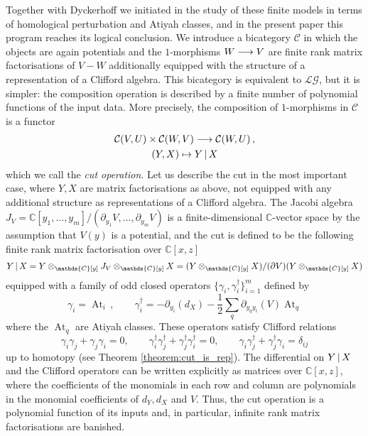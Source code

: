 \documentclass[english,letter paper,12pt,leqno]{article}
\theoremstyle{example}
\numberwithin{equation}{section}
\def\LG{\mathcal{LG}}
\def\be{\begin{equation}}
\def\ee{\end{equation}}
\def\nC{\mathds{C}}
\def\L{\mathcal{C}}
\def\ferm{\gamma}
\def\fermc{\gamma^\dagger}
\DeclareMathOperator{\At}{At}
\begin{document}
Together with Dyckerhoff we initiated in \cite{dm1102.2957} the study of these finite models in terms of homological perturbation and Atiyah classes, and in the present paper this program reaches its logical conclusion. We introduce a bicategory $\L$ in which the objects are again potentials and the $1$-morphisms $W \longrightarrow V$ are finite rank matrix factorisations of $V - W$ additionally equipped with the structure of a representation of a Clifford algebra. This bicategory is equivalent to $\LG$, but it is simpler: the composition operation is described by a finite number of polynomial functions of the input data. More precisely, the composition of $1$-morphisms in $\L$ is a functor
\begin{gather}
\L(V,U) \times \L(W,V) \lto \L(W,U)\,,\label{eq:cut_functor_intro}\\
(Y,X) \mapsto Y \l X
\end{gather}
which we call the \emph{cut operation}. Let us describe the cut in the most important case, where $Y, X$ are matrix factorisations as above, not equipped with any additional structure as representations of a Clifford algebra. The Jacobi algebra $J_V = \nC[y_1,\ldots,y_m]/(\partial_{y_1} V, \ldots, \partial_{y_m} V)$ is a finite-dimensional $\nC$-vector space by the assumption that $V(y)$ is a potential, and the cut is defined to be the following finite rank matrix factorisation over $\nC[x,z]$
\be
Y \l X = Y \otimes_{\nC[y]} J_V \otimes_{\nC[y]} X = ( Y \otimes_{\nC[y]} X ) / (\partial V) (Y \otimes_{\nC[y]} X )
\ee
equipped with a family of odd closed operators $\{\ferm_i, \fermc_i\}_{i=1}^m$ defined by
\begin{equation}\label{eq:intro_clifford_act1_intro}
\ferm_i = \At_i\,, \qquad \fermc_i = - \partial_{y_i}(d_X) - \frac{1}{2} \sum_q \partial_{y_q y_i}(V) \At_{q}
\end{equation}
where the $\At_q$ are Atiyah classes. These operators satisfy Clifford relations
\be\label{eq:clifford_relations_intro}
\ferm_i \ferm_j + \ferm_j \ferm_i = 0, \qquad \fermc_i \fermc_j + \fermc_j \fermc_i = 0, \qquad \ferm_i \fermc_j + \fermc_j \ferm_i = \delta_{ij}
\ee
up to homotopy (see Theorem \ref{theorem:cut_is_rep}). The differential on $Y \,|\, X$ and the Clifford operators can be written explicitly as matrices over $\nC[x,z]$, where the coefficients of the monomials in each row and column are polynomials in the monomial coefficients of $d_Y, d_X$ and $V$. Thus, the cut operation is a polynomial function of its inputs and, in particular, infinite rank matrix factorisations are banished. 
\end{document}
